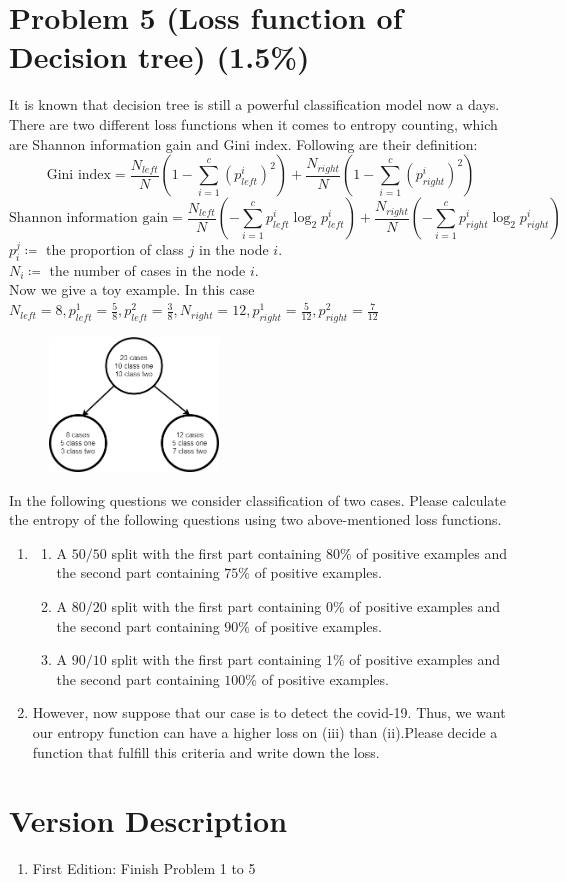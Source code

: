 \documentclass{article}
\begin{document}
\section*{Problem 5 (Loss function of Decision tree) (1.5\%)}
It is known that decision tree is still a powerful classification model now a days. There are two different loss functions when it comes to entropy counting, which are Shannon information gain and Gini index. Following are their definition:
\[
\text{Gini index} = \frac{N_{left}}{N}\left(1-\sum_{i=1}^c \left(p_{left}^i\right)^2\right) + \frac{N_{right}}{N}\left(1-\sum_{i=1}^c \left(p_{right}^i\right)^2\right)
\]
\[
\text{Shannon information gain} = \frac{N_{left}}{N}\left(-\sum_{i=1}^c p_{left}^i \log_2p_{left}^i\right) + \frac{N_{right}}{N}\left(-\sum_{i=1}^c p_{right}^i \log_2p_{right}^i\right)
\]
$p_i^j \coloneqq$ the proportion of class $j$ in the node $i$.\\
$N_i \coloneqq$ the number of cases in the node $i$.\\
Now we give a toy example. In this case $N_{left} = 8,p_{left}^1=\frac{5}{8},p_{left}^2=\frac{3}{8},N_{right}=12,p_{right}^1=\frac{5}{12},p_{right}^2=\frac{7}{12}$
\begin{figure}[h]
    \centering
    \includegraphics[width=0.4\textwidth]{ex_dt.png}
\end{figure}


In the following questions we consider classification of two cases. Please calculate the entropy of the following questions using two above-mentioned loss functions.
\begin{enumerate}[label=(\alph*)]
\item 
\begin{enumerate}[label=(\roman*)]
    \item A $50/50$ split with the first part containing $80 \%$ of positive examples and the second part containing $75 \%$ of positive examples.
    \item A $80/20$ split with the first part containing $0 \%$ of positive examples and the second part containing $90 \%$ of positive examples.
    \item A $90/10$ split with the first part containing $1 \%$ of positive examples and the second part containing $100 \%$ of positive examples.
\end{enumerate}
\item However, now suppose that our case is to detect the covid-19. Thus, we want our entropy function can have a higher loss on (iii) than (ii).Please decide a function that fulfill this criteria and write down the loss.
\end{enumerate}


 \section*{Version Description}
 \begin{enumerate}
     \item First Edition: Finish Problem 1 to 5
 \end{enumerate}
\end{document}
